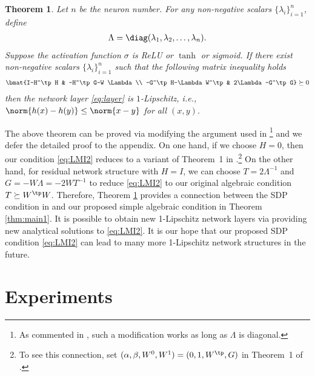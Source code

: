 \documentclass{article} \usepackage{iclr2023_conference,times}
\newtheorem{theorem}{Theorem}
\newcommand{\0}{\mathbf{0} }
\begin{document}
\begin{theorem}\label{thm1}
Let $n$ be the neuron number. 
For any non-negative scalars $\{\lambda_i\}_{i=1}^n$, define 
\begin{align}
\Lambda=\diag(\lambda_{1},\lambda_{2},\ldots, \lambda_{n}).
\end{align}
Suppose the activation function $\sigma$ is ReLU or $\tanh$ or sigmoid. 
 If there exist non-negative scalars $\{\lambda_{i}\}_{i=1}^n$ such that the following matrix inequality holds
\begin{align}\label{eq:LMI2}
  \bmat{I-H^\tp H & -H^\tp G-W \Lambda \\ -G^\tp H-\Lambda W^\tp & 2\Lambda-G^\tp G}\succeq 0
\end{align}
then the network layer \eqref{eq:layer} is $1$-Lipschitz, i.e., $\norm{h(x)-h(y)}\le \norm{x-y}$ for all $(x,y)$. 
\end{theorem}
The above theorem can be proved via modifying the argument used in \citet[Theorem~1]{fazlyab2019efficient}\footnote{As commented in \cite{pauli2021training}, such a modification works as long as $\Lambda$ is diagonal.} and we defer the detailed proof to the appendix. 
On one hand, if we choose $H=0$, then our condition \eqref{eq:LMI2} reduces to a variant of Theorem~1 in  \citet{fazlyab2019efficient}.\footnote{To see this connection, set $(\alpha,\beta,W^0,W^1)=(0,1,W^\tp, G)$ in Theorem~1 of \citet{fazlyab2019efficient}.}
On the other hand, for residual network structure with $H=I$, we can choose $T=2\Lambda^{-1}$ and $G=-W\Lambda=-2WT^{-1}$ to reduce \eqref{eq:LMI2} to our original algebraic condition $T\succeq W^\tp W$.  Therefore, Theorem \ref{thm1} provides a connection between the SDP condition in \cite{fazlyab2019efficient} and our proposed simple algebraic condition in Theorem \ref{thm:main1}. It is possible to obtain new 1-Lipschitz network layers via providing new analytical solutions to \eqref{eq:LMI2}. It is our hope that our proposed SDP condition \eqref{eq:LMI2} can lead to many more 1-Lipschitz network structures in the future.
 
 
\section{Experiments}
\label{section:experiments}
\end{document}
